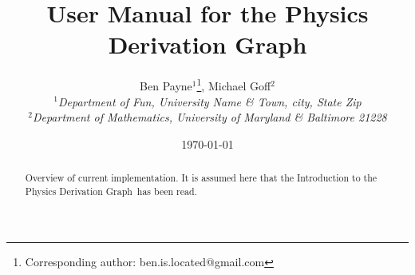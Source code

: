 \documentclass{article}
\newcommand{\pdg}{Physics Derivation Graph}
\begin{document}
\title{User Manual for the Physics Derivation Graph}

\author{Ben Payne$^{1}$\footnote{Corresponding author: ben.is.located@gmail.com}, Michael Goff$^{2}$\\
{\it $^{1}$Department of Fun, University Name \& Town, city, State Zip}\\
{\it $^{2}$Department of Mathematics, University of Maryland \& Baltimore 21228}}

\date{\today}


\maketitle %
\begin{abstract}
Overview of current implementation. It is assumed here that the Introduction to the \pdg\ has been read. 
\end{abstract}
\end{document}
